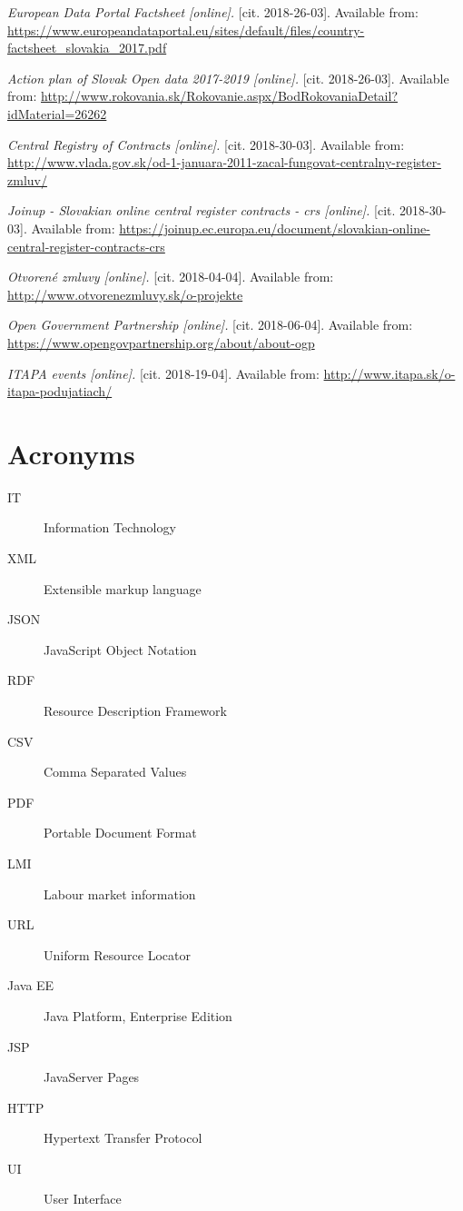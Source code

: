 \documentclass[thesis=B,english]{FITthesis}[2012/06/26]
\begin{document}
\begin{thebibliography}{9}
\textit{European Data Portal Factsheet [online].}
[cit. 2018-26-03]. Available from: \url{https://www.europeandataportal.eu/sites/default/files/country-factsheet_slovakia_2017.pdf}

\textit{Action plan of Slovak Open data 2017-2019 [online].}
[cit. 2018-26-03]. Available from: \url{http://www.rokovania.sk/Rokovanie.aspx/BodRokovaniaDetail?idMaterial=26262}

\textit{Central Registry of Contracts [online].}
[cit. 2018-30-03]. Available from: \url{http://www.vlada.gov.sk/od-1-januara-2011-zacal-fungovat-centralny-register-zmluv/}

\textit{Joinup - Slovakian online central register contracts - crs [online].}
[cit. 2018-30-03]. Available from: \url{https://joinup.ec.europa.eu/document/slovakian-online-central-register-contracts-crs}

\textit{Otvorené zmluvy [online].}
[cit. 2018-04-04]. Available from: \url{http://www.otvorenezmluvy.sk/o-projekte}

\textit{Open Government Partnership [online].}
[cit. 2018-06-04]. Available from: \url{https://www.opengovpartnership.org/about/about-ogp}

\textit{ITAPA events [online].}
[cit. 2018-19-04]. Available from: \url{http://www.itapa.sk/o-itapa-podujatiach/}

\end{thebibliography}

\chapter{Acronyms}
\begin{description}
	\item[IT] Information Technology
	\item[XML] Extensible markup language
	\item[JSON] JavaScript Object Notation
	\item[RDF] Resource Description Framework
	\item[CSV] Comma Separated Values
	\item[PDF] Portable Document Format
	\item[LMI] Labour market information
	\item[URL] Uniform Resource Locator
	\item[Java EE] Java Platform, Enterprise Edition
	\item[JSP] JavaServer Pages
	\item[HTTP] Hypertext Transfer Protocol
	\item[UI] User Interface
\end{description}
\end{document}
